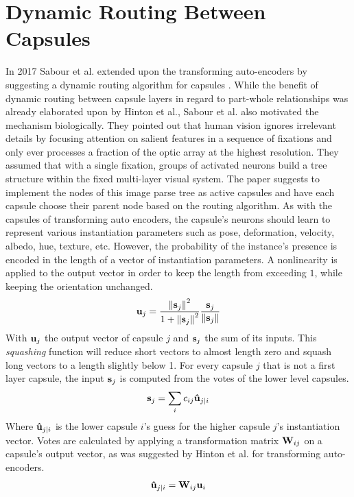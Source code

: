 \section{Dynamic Routing Between Capsules}\label{sec:dynamic-routing}
In 2017 Sabour et al. extended upon the transforming auto-encoders by suggesting a dynamic routing algorithm for capsules \cite{sabour2017dynamic}. While the benefit of dynamic routing between capsule layers in regard to part-whole relationships was already elaborated upon by Hinton et al., Sabour et al. also motivated the mechanism biologically. They pointed out that human vision ignores irrelevant details by focusing attention on salient features in a sequence of fixations and only ever processes a fraction of the optic array at the highest resolution. They assumed that with a single fixation, groups of activated neurons build a tree structure within the fixed multi-layer visual system. The paper suggests to implement the nodes of this image parse tree as active capsules and have each capsule choose their parent node based on the routing algorithm. As with the capsules of transforming auto encoders, the capsule's neurons should learn to represent various instantiation parameters such as pose, deformation, velocity, albedo, hue, texture, etc. However, the probability of the instance's presence is encoded in the length of a vector of instantiation parameters. A nonlinearity is applied to the output vector in order to keep the length from exceeding $\num{1}$, while keeping the orientation unchanged.
\begin{align}
    \vb{u}_j = \frac{\norm{\vb{s}_j}^2}{1+\norm{\vb{s}_j}^2}\frac{\vb{s}_j}{\norm{\vb{s}_j}}
    \label{eq:squash}
\end{align}
With $\vb{u}_j$ the output vector of capsule $j$ and $\vb{s}_j$ the sum of its inputs. This \emph{squashing} function will reduce short vectors to almost length zero and squash long vectors to a length slightly below 1. For every capsule $j$ that is not a first layer capsule, the input $\vb{s}_j$ is computed from the votes of the lower level capsules.
\begin{align}
    \vb{s}_j = \sum_i c_{ij} \vb{\hat{u}}_{j|i}
\end{align}
Where $\vb{\hat{u}}_{j|i}$ is the lower capsule $i$'s guess for the higher capsule $j$'s instantiation vector. Votes are calculated by applying a transformation matrix $\vb{W}_{ij}$ on a capsule's output vector, as was suggested by Hinton et al. for transforming auto-encoders.
\begin{align}
    \vb{\hat{u}}_{j|i} = \vb{W}_{ij}\vb{u}_i
\end{align}
